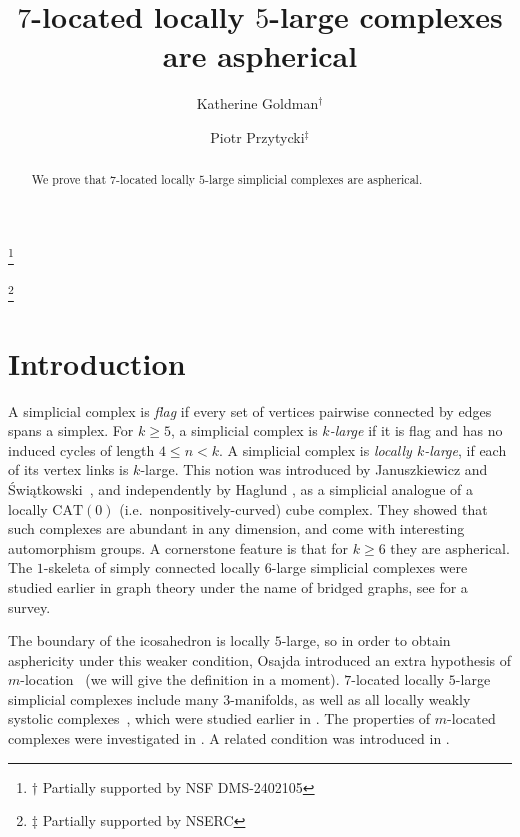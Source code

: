 \documentclass[a4paper,12pt,leqno]{amsart}
\title{$7$-located locally $5$-large complexes are aspherical}
\theoremstyle{definition}
\begin{document}
\author[K.~Goldman]{Katherine Goldman$^{\dag}$}
	\address{
		Department of Mathematics and Statistics,
		McGill University,
		Burnside Hall,
		805 Sherbrooke Street West,
		Montreal, QC,
		H3A 0B9, Canada}
        

\thanks{$\dag$ Partially supported by NSF DMS-2402105}

    
	\author[P.~Przytycki]{Piotr Przytycki$^{\ddag}$}
	
	\address{
		Department of Mathematics and Statistics,
		McGill University,
		Burnside Hall,
		805 Sherbrooke Street West,
		Montreal, QC,
		H3A 0B9, Canada}
	
	
	\thanks{$\ddag$ Partially supported by NSERC}




	\begin{abstract}
		\noindent
		We prove that $7$-located locally $5$-large simplicial complexes are aspherical.
	\end{abstract}

\maketitle

\section{Introduction}
A simplicial complex is \emph{flag} if every set of vertices pairwise connected by edges spans a simplex. For $k\geq 5$, a simplicial complex is \emph{$k$-large} if it is flag and has no induced cycles of length $4\leq n<k$. A simplicial complex is \emph{locally $k$-large}, if each of its vertex links is $k$-large. 
This notion was introduced by Januszkiewicz and \'Swiątkowski~\cite{JS}, and independently by Haglund \cite{H}, as a simplicial analogue of a locally $\mathrm{CAT}(0)$ (i.e.\ nonpositively-curved) cube complex. They showed that such complexes are abundant in any dimension, and come with interesting automorphism groups. A cornerstone feature is that for $k\geq 6$ they are aspherical. The $1$-skeleta of simply connected locally $6$-large simplicial complexes were studied earlier in graph theory under the name of bridged graphs, see \cite{BC} for a survey.

The boundary of the icosahedron is locally $5$-large, so in order to obtain asphericity under this weaker condition, Osajda introduced an extra hypothesis of $m$-location~\cite{O2} (we will give the definition in a moment). $7$-located locally $5$-large simplicial complexes include many $3$-manifolds, as well as all locally weakly systolic complexes~\cite{HL}, which were studied earlier in \cite{O1,CO}. The properties of $m$-located complexes were investigated in \cite{O2,HL}. A related condition was introduced in \cite{L}.
\end{document}
